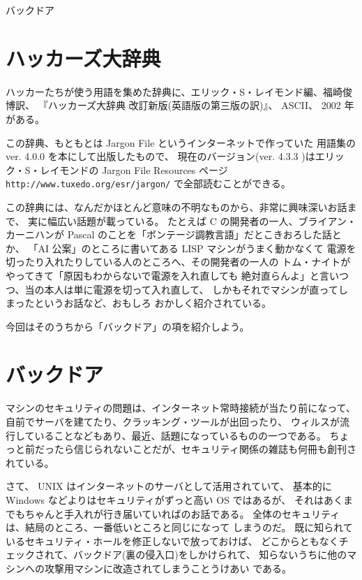 \documentclass[11pt,titlepage]{jarticle}
\begin{document}
\begin{center}
{\LARGE バックドア}
\end{center}

\section{ハッカーズ大辞典}

ハッカーたちが使う用語を集めた辞典に、エリック・S・レイモンド編、福崎俊博訳、
『ハッカーズ大辞典 改訂新版(英語版の第三版の訳)』、 ASCII、 2002 年がある。

この辞典、もともとは Jargon File というインターネットで作っていた
用語集の ver. 4.0.0 を本にして出版したもので、
現在のバージョン(ver. 4.3.3 )はエリック・S・レイモンドの Jargon File Resources ページ
\texttt{http://www.tuxedo.org/{\TILDE}esr/jargon/} で全部読むことができる。

この辞典には、なんだかほとんど意味の不明なものから、非常に興味深いお話まで、
実に幅広い話題が載っている。
たとえば C の開発者の一人、ブライアン・カーニハンが
 Pascal のことを「ボンテージ調教言語」だとこきおろした話とか、
「AI 公案」のところに書いてある LISP マシンがうまく動かなくて
電源を切ったり入れたりしている人のところへ、その開発者の一人の
トム・ナイトがやってきて「原因もわからないで電源を入れ直しても
絶対直らんよ」と言いつつ、当の本人は単に電源を切って入れ直して、
しかもそれでマシンが直ってしまったというお話など、おもしろ
おかしく紹介されている。

今回はそのうちから「バックドア」の項を紹介しよう。

\section{バックドア}

マシンのセキュリティの問題は、インターネット常時接続が当たり前になって、
自前でサーバを建てたり、クラッキング・ツールが出回ったり、
ウィルスが流行していることなどもあり、最近、話題になっているものの一つである。
ちょっと前だったら信じられないことだが、セキュリティ関係の雑誌も何冊も創刊されている。

さて、 UNIX はインターネットのサーバとして活用されていて、
基本的に Windows などよりはセキュリティがずっと高い OS ではあるが、
それはあくまでもちゃんと手入れが行き届いていればのお話である。
全体のセキュリティは、結局のところ、一番低いところと同じになって
しまうのだ。
既に知られているセキュリティ・ホールを修正しないで放っておけば、
どこからともなくチェックされて、バックドア(裏の侵入口)をしかけられて、
知らないうちに他のマシンへの攻撃用マシンに改造されてしまうことうけあい
である。
\end{document}
